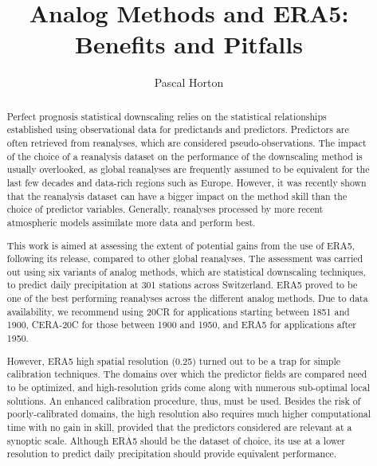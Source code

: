 \documentclass[alpha-refs]{wiley-article}
\title{Analog Methods and ERA5: Benefits and Pitfalls}
\author[1]{Pascal Horton}
\affil[1]{Oeschger Centre for Climate Change Research and Institute of Geography, University of Bern, Bern, Switzerland}
\begin{document}
\maketitle

\begin{abstract}
Perfect prognosis statistical downscaling relies on the statistical relationships established using observational data for predictands and predictors. Predictors are often retrieved from reanalyses, which are considered pseudo-observations. The impact of the choice of a reanalysis dataset on the performance of the downscaling method is usually overlooked, as global reanalyses are frequently assumed to be equivalent for the last few decades and data-rich regions such as Europe. However, it was recently shown that the reanalysis dataset can have a bigger impact on the method skill than the choice of predictor variables. Generally, reanalyses processed by more recent atmospheric models assimilate more data and perform best.

This work is aimed at assessing the extent of potential gains from the use of ERA5, following its release, compared to other global reanalyses. The assessment was carried out using six variants of analog methods, which are statistical downscaling techniques, to predict daily precipitation at 301 stations across Switzerland. ERA5 proved to be one of the best performing reanalyses across the different analog methods. Due to data availability, we recommend using 20CR for applications starting between 1851 and 1900, CERA-20C for those between 1900 and 1950, and ERA5 for applications after 1950.

However, ERA5 high spatial resolution (0.25\degree) turned out to be a trap for simple calibration techniques. The domains over which the predictor fields are compared need to be optimized, and high-resolution grids come along with numerous sub-optimal local solutions. An enhanced calibration procedure, thus, must be used. Besides the risk of poorly-calibrated domains, the high resolution also requires much higher computational time with no gain in skill, provided that the predictors considered are relevant at a synoptic scale. Although ERA5 should be the dataset of choice, its use at a lower resolution to predict daily precipitation should provide equivalent performance.



\end{abstract}
\end{document}
